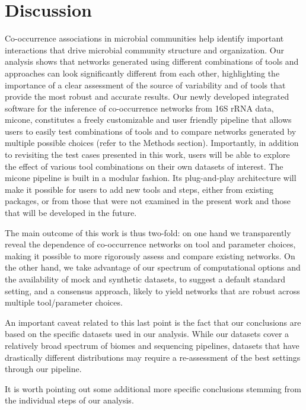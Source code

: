 
\section*{Discussion}

Co-occurrence associations in microbial communities help identify important interactions that drive microbial community structure and organization.
Our analysis shows that networks generated using different combinations of tools and approaches can look significantly different from each other, highlighting the importance of a clear assessment of the source of variability and of tools that provide the most robust and accurate results.
Our newly developed integrated software for the inference of co-occurrence networks from 16S rRNA data, \ac{micone}, constitutes a freely customizable and user friendly pipeline that allows users to easily test combinations of tools and to compare networks generated by multiple possible choices (refer to the Methods section).
Importantly, in addition to revisiting the test cases presented in this work, users will be able to explore the effect of various tool combinations on their own datasets of interest.
The \ac{micone} pipeline is built in a modular fashion.
Its plug-and-play architecture will make it possible for users to add new tools and steps, either from existing packages, or from those that were not examined in the present work and those that will be developed in the future.

The main outcome of this work is thus two-fold: on one hand we transparently reveal the dependence of co-occurrence networks on tool and parameter choices, making it possible to more rigorously assess and compare existing networks.
On the other hand, we take advantage of our spectrum of computational options and the availability of mock and synthetic datasets, to suggest a default standard setting, and a consensus approach, likely to yield networks that are robust across multiple tool/parameter choices.

An important caveat related to this last point is the fact that our conclusions are based on the specific datasets used in our analysis.
While our datasets cover a relatively broad spectrum of biomes and sequencing pipelines, datasets that have drastically different distributions may require a re-assessment of the best settings through our pipeline.

It is worth pointing out some additional more specific conclusions stemming from the individual steps of our analysis.

